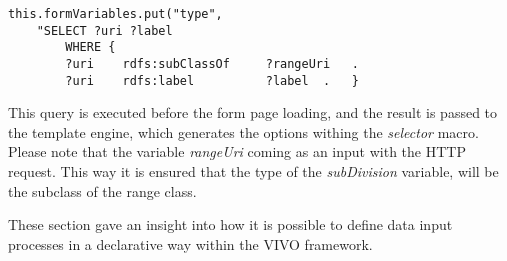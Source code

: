 \begin{lstlisting}[captionpos=b, caption= Query for form data, label=skullJSON, belowskip=1em, aboveskip=2em,
basicstyle=\footnotesize,frame=single]
this.formVariables.put("type", 
	"SELECT ?uri ?label
		WHERE {
		?uri	rdfs:subClassOf		?rangeUri	.
		?uri	rdfs:label			?label	.	}
\end{lstlisting}

This query is executed before the form page loading, and the result is passed to the template engine, which generates the options withing the \textit{selector} macro. Please note that the variable \textit{rangeUri} coming as an input with the HTTP request. This way it is ensured that the type of the \textit{subDivision} variable, will be the subclass of the range class.

These section gave an insight into how it is possible to define data input processes in a declarative way within the VIVO framework.





